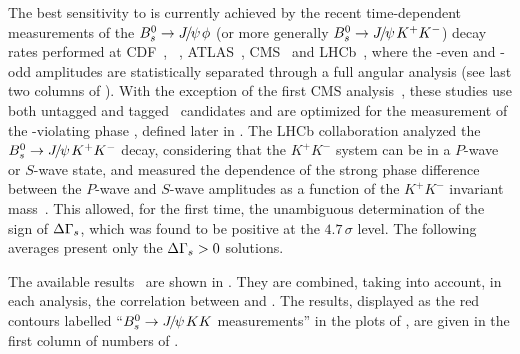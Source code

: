 
The best sensitivity to \DGs is currently achieved 
by the recent time-dependent measurements
of the $B^0_s\to{J\mskip -3mu/\mskip -2mu\psi\mskip 2mu}\phi$ (or more generally $B^0_s\to{J\mskip -3mu/\mskip -2mu\psi\mskip 2mu} K^+K^-$) decay rates performed at
CDF~\cite{Aaltonen:2012ie,*CDF:2011af,*Aaltonen:2007he_mod,*Aaltonen:2007gf_mod},
\dzero~\cite{Abazov:2011ry,*Abazov_mod:2008fj,*Abazov:2007tx_mod_cont}, 
ATLAS~\cite{Aad:2014cqa,*Aad:2012kba_cont}, CMS~\cite{CMS-PAS-BPH-11-006,CMS-PAS-BPH-13-012}
and LHCb~\cite{Aaij:2014zsa,*Aaij:2013oba_supersede2},
where the \CP-even and \CP-odd
amplitudes are statistically separated through a full angular analysis
(see last two columns of ). 
With the exception of the first CMS analysis~\cite{CMS-PAS-BPH-11-006},
these studies use both untagged and tagged \Bs\ candidates and 
are optimized for the measurement of the \CP-violating 
phase \phiccbars, defined later in .
The LHCb collaboration analyzed the $B^0_s \to {J\mskip -3mu/\mskip -2mu\psi\mskip 2mu} K^+K^-$
decay, considering that the $K^+K^-$ system can be in a $P$-wave or $S$-wave state, 
and measured the dependence of the strong phase difference between the 
$P$-wave and $S$-wave amplitudes as a function of the $K^+K^-$ invariant
mass~\cite{Aaij:2012eq}. 
This allowed, for the first time, the unambiguous determination of the sign of 
$\Delta\Gamma_{s}$, which was found to be positive at the $4.7\,\sigma$ level. 
The following averages present only the $\Delta\Gamma_{s} > 0$ solutions.


The available results~\cite{Aaltonen:2012ie,*CDF:2011af,*Aaltonen:2007he_mod,*Aaltonen:2007gf_mod,Abazov:2011ry,*Abazov_mod:2008fj,*Abazov:2007tx_mod_cont,Aad:2014cqa,*Aad:2012kba_cont,CMS-PAS-BPH-11-006,CMS-PAS-BPH-13-012,Aaij:2014zsa,*Aaij:2013oba_supersede2}
are shown in . They are combined, taking into account, in each analysis, the correlation between \DGs and \Gs.
The results, displayed as the red contours labelled ``$B^0_s \to {J\mskip -3mu/\mskip -2mu\psi\mskip 2mu} KK$ measurements'' in the
plots of , are given in the first column of numbers of .

